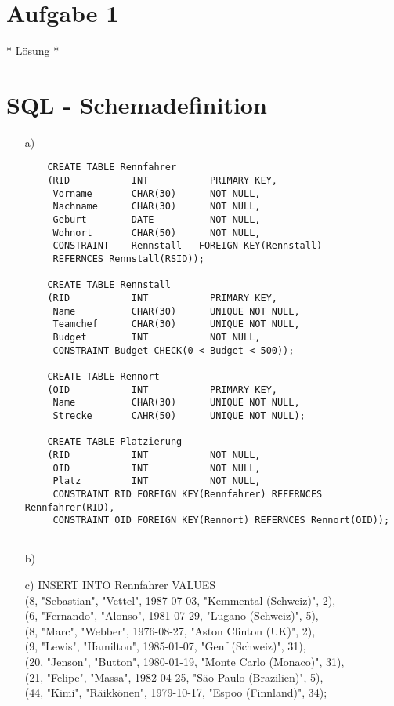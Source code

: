 \documentclass[a4paper,12pt]{scrartcl}
\begin{document}
\section{Aufgabe 1}
* L\"osung *

\section{SQL - Schemadefinition}
\begin{enumerate}
	\item[a)] 
	\begin{verbatim}
	CREATE TABLE Rennfahrer 
	(RID           INT           PRIMARY KEY,
	 Vorname       CHAR(30)      NOT NULL,
	 Nachname      CHAR(30)      NOT NULL,
	 Geburt        DATE          NOT NULL,
	 Wohnort       CHAR(50)      NOT NULL,
	 CONSTRAINT    Rennstall   FOREIGN KEY(Rennstall) 
	 REFERNCES Rennstall(RSID));
	 
	CREATE TABLE Rennstall
	(RID           INT           PRIMARY KEY,
	 Name          CHAR(30)      UNIQUE NOT NULL,
	 Teamchef      CHAR(30)      UNIQUE NOT NULL,
	 Budget        INT           NOT NULL,
	 CONSTRAINT Budget CHECK(0 < Budget < 500));
	 
	CREATE TABLE Rennort
	(OID           INT           PRIMARY KEY,
	 Name          CHAR(30)      UNIQUE NOT NULL, 
	 Strecke       CAHR(50)      UNIQUE NOT NULL);
	   
	CREATE TABLE Platzierung
	(RID           INT           NOT NULL,           
	 OID           INT           NOT NULL,
	 Platz         INT           NOT NULL,
	 CONSTRAINT RID FOREIGN KEY(Rennfahrer) REFERNCES Rennfahrer(RID),
	 CONSTRAINT OID FOREIGN KEY(Rennort) REFERNCES Rennort(OID));
	   	   	
	\end{verbatim}
	\item[b)] 
	\item[c)] INSERT INTO Rennfahrer VALUES\\
			  (8, "Sebastian", "Vettel", 1987-07-03, "Kemmental (Schweiz)", 2),\\
			  (6, "Fernando", "Alonso", 1981-07-29, "Lugano (Schweiz)", 5),\\
			  (8, "Marc", "Webber", 1976-08-27, "Aston Clinton (UK)", 2),\\
			  (9, "Lewis", "Hamilton", 1985-01-07, "Genf (Schweiz)", 31),\\
			  (20, "Jenson", "Button", 1980-01-19, "Monte Carlo (Monaco)", 31),\\
			  (21, "Felipe", "Massa", 1982-04-25, "S\"ao Paulo (Brazilien)", 5),\\
			  (44, "Kimi", "R\"aikk\"onen", 1979-10-17, "Espoo (Finnland)", 34);\\
			  

\end{enumerate}
\end{document}
